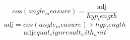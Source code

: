 \[cos({angle_measure})=\frac{\text{{{adj}}}}{{{hyp_length}}}\]
\[\text{{{adj}}}=cos({angle_measure})\times {hyp_length}\]
\[\text{{{adj}}}{equal_sign}{result_with_unit}\]
